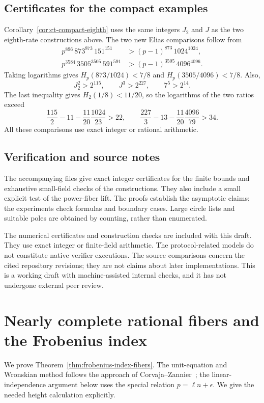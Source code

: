 \documentclass[11pt,letterpaper]{article}
\theoremstyle{definition}
\theoremstyle{remark}
\begin{document}
\subsection{Certificates for the compact examples}
\label{app:compact-certificates}

Corollary~\ref{cor:ct-compact-eighth} uses the same integers $J_2$ and
$J$ as the two eighth-rate constructions above. The two new Elias
comparisons follow from
\begin{align*}
 p^{896}\,873^{873}\,151^{151}
   &>(p-1)^{873}\,1024^{1024},\\
 p^{3584}\,3505^{3505}\,591^{591}
   &>(p-1)^{3505}\,4096^{4096}.
\end{align*}
Taking logarithms gives $H_p(873/1024)<7/8$ and
$H_p(3505/4096)<7/8$. Also,
\[
 J_2^2>2^{115},\qquad J^3>2^{227},\qquad 7^5>2^{14}.
\]
The last inequality gives $H_2(1/8)<11/20$, so the logarithms of
the two ratios exceed
\[
 \frac{115}{2}-11-\frac{11}{20}\frac{1024}{23}>22,
 \qquad
 \frac{227}{3}-13-\frac{11}{20}\frac{4096}{79}>34.
\]
All these comparisons use exact integer or rational arithmetic.

\subsection{Verification and source notes}


The accompanying files give exact integer certificates for the finite
bounds and exhaustive small-field checks of the constructions. They
also include a small explicit test of the power-fiber lift. The proofs
establish the asymptotic claims; the experiments check formulas and
boundary cases. Large circle lists and suitable poles are obtained
by counting, rather than enumerated.

The numerical certificates and construction checks are included with
this draft. They use exact integer or finite-field arithmetic. The
protocol-related models do not constitute native verifier executions.
The source comparisons concern the cited repository revisions; they
are not claims about later implementations. This is a working draft
with machine-assisted internal checks, and it has not undergone
external peer review.

\section{Nearly complete rational fibers and the Frobenius index}
\label{app:frobenius-index}

We prove Theorem~\ref{thm:frobenius-index-fibers}. The unit-equation
and Wronskian method follows the approach of
Corvaja--Zannier~\cite[Proposition~2]{corvaja-zannier}; the
linear-independence argument below uses the special relation
$p=\ell n+\epsilon$. We give the needed height calculation explicitly.
\end{document}
